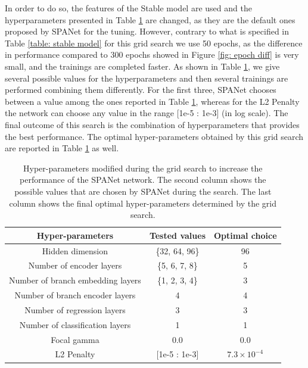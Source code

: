 In order to do so, the features of the Stable model are used and the hyperparameters presented in Table \ref{table: parameters for the grid search} are changed, as they are the default ones proposed by SPANet for the tuning. 
However, contrary to what is specified in Table \ref{table: stable model} for this grid search we use 50 epochs, as the difference in performance compared to 300 epochs showed in Figure \ref{fig: epoch diff} is very small, and the trainings are completed faster.
As shown in Table \ref{table: parameters for the grid search}, we give several possible values for the hyperparameters and then several trainings are performed combining them differently.
For the first three, SPANet chooses between a value among the ones reported in Table \ref{table: parameters for the grid search}, whereas for the L2 Penalty the network can choose any value in the range [1e-5 : 1e-3] (in log scale).
The final outcome of this search is the combination of hyperparameters that provides the best performance. The optimal hyper-parameters obtained by this grid search are reported in Table \ref{table: parameters for the grid search} as well.

\begin{table}[hbt]
   \centering
   \begin{tabular}{|c|c|c|}
   \hline
    Hyper-parameters  &  Tested values & Optimal choice \\
    \hline
    Hidden dimension  &  \{32, 64, 96\} & 96 \\
    \hline
   Number of encoder layers & \{5, 6, 7, 8\} & 5 \\
    \hline
    Number of branch embedding layers &  \{1, 2, 3, 4\} & 3 \\
    \hline
     Number of branch encoder layers & 4 & 4\\
    \hline
    Number of regression layers & 3 & 3 \\
    \hline
    Number of classification layers & 1 & 1\\
    \hline
    Focal gamma & 0.0 & 0.0 \\
    \hline
    L2 Penalty & [1e-5 : 1e-3] & $7.3\times 10^{-4}$ \\
    \hline
   \end{tabular}
   \caption{Hyper-parameters modified during the grid search to increase the performance of the SPANet network. The second column shows the possible values that are chosen by SPANet during the search. The last column shows the final optimal hyper-parameters determined by the grid search.}
   \label{table: parameters for the grid search}
\end{table}

